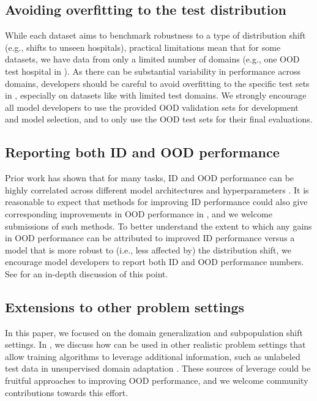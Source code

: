 \subsection{Avoiding overfitting to the test distribution}
While each \Wilds dataset aims to benchmark robustness to a type of distribution shift (e.g., shifts to unseen hospitals), practical limitations mean that for some datasets, we have data from only a limited number of domains (e.g., one OOD test hospital in \Camelyon).
As there can be substantial variability in performance across domains,
developers should be careful to avoid overfitting to the specific test sets in \Wilds, especially on datasets like \Camelyon with limited test domains.
We strongly encourage all model developers to use the provided OOD validation sets for development and model selection, and to only use the OOD test sets for their final evaluations.

\subsection{Reporting both ID and OOD performance}
Prior work has shown that for many tasks, ID and OOD performance can be highly correlated across different model architectures and hyperparameters \citep{taori2020measuring,liu2021concur,miller2021line}.
It is reasonable to expect that methods for improving ID performance could also give corresponding improvements in OOD performance in \Wilds, and we welcome submissions of such methods.
To better understand the extent to which any gains in OOD performance can be attributed to improved ID performance versus a model that is more robust to (i.e., less affected by) the distribution shift,
we encourage model developers to report both ID and OOD performance numbers.
See \citet{miller2021line} for an in-depth discussion of this point.


\subsection{Extensions to other problem settings}
In this paper, we focused on the domain generalization and subpopulation shift settings.
In , we discuss how \Wilds can be used  in other realistic problem settings that allow training algorithms to leverage additional information, such as unlabeled test data in unsupervised domain adaptation \citep{bendavid2006analysis}.
These sources of leverage could be fruitful approaches to improving OOD performance, and we welcome community contributions towards this effort.
